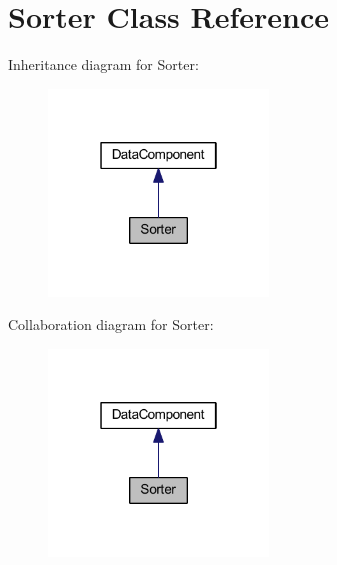 \hypertarget{classhamburgscleanest_1_1_data_tables_1_1_models_1_1_data_components_1_1_sorter}{}\section{Sorter Class Reference}
\label{classhamburgscleanest_1_1_data_tables_1_1_models_1_1_data_components_1_1_sorter}


Inheritance diagram for Sorter\+:
\nopagebreak
\begin{figure}[H]
\begin{center}
\leavevmode
\includegraphics[width=166pt]{classhamburgscleanest_1_1_data_tables_1_1_models_1_1_data_components_1_1_sorter__inherit__graph}
\end{center}
\end{figure}


Collaboration diagram for Sorter\+:
\nopagebreak
\begin{figure}[H]
\begin{center}
\leavevmode
\includegraphics[width=166pt]{classhamburgscleanest_1_1_data_tables_1_1_models_1_1_data_components_1_1_sorter__coll__graph}
\end{center}
\end{figure}
